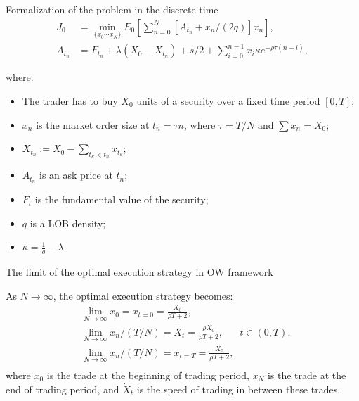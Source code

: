 \documentclass[aspectratio=169]{beamer}
\begin{document}
\begin{frame}{Formalization of the problem in the discrete time}
    \begin{align} \label{optexp}
        J_0 &= \min _{\{x_0 \cdots x_N \}} E_0 \left[ \sum _{n=0}^N [A_{t_n} + x_n /(2q)] x_n\right], \\ 
        A_{t_n} &= F_{t_n} + \lambda (X_0 - X_{t_n}) + s/2 + \sum _{i=0}^{n-1} x_i \kappa e^{- \rho \tau (n - i)},
     \end{align}
     
    where:
    \begin{itemize}
     \item The trader has to buy $X_0$ units of a security over a fixed time period $[0,T]$; 
     \item $x_{n}$ 
     is the market order size at $t_n = \tau n$, where $\tau = T / N$ and $\sum x_n = X_0$;
     \item $X_{t_n} := X_0 - \sum _{t_k < t_n} x_{t_k}$;
     \item $A_{t_n}$ is an ask price at $t_n$; 
     \item $F_t$ is the fundamental value of the security;
     \item $q$ is a LOB density;
     \item $\kappa = \frac{1}{q} - \lambda $.
    \end{itemize}

\end{frame}


\begin{frame}{The limit of the optimal execution strategy in OW framework}
    
    \begin{theorem}
        As $N \rightarrow \infty$, the optimal execution strategy becomes:
        \begin{align*}
            & \lim _{N \rightarrow \infty} x_0 = x_{t = 0} = \frac{X_0}{\rho T + 2}, \\
            & \lim _{N \rightarrow \infty} x_n / (T/N) = \dot X _t = \frac{\rho X_0}{\rho T + 2}, \;\;\;\;\;\; t \in (0, T), \\
            & \lim _{N \rightarrow \infty} x_n / (T/N) = x_{t=T}=  \frac{X_0}{\rho T + 2},  \\
        \end{align*}
        where $x_0$ is the trade at the beginning of trading period, $x_N$ is the trade at the end of trading
        period, and $\dot X _t$ is the speed of trading in between these trades.
    \end{theorem}

\end{frame}
\end{document}
